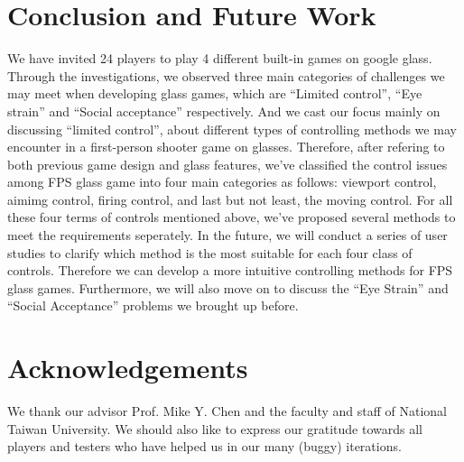 \documentclass{acm_proc_article-sp}
\begin{document}
\section{Conclusion and Future Work}
We have invited 24 players to play 4 different built-in games on google glass. Through the investigations, we observed three main categories of challenges we may meet when developing glass games, which are ``Limited control'', ``Eye strain'' and ``Social acceptance'' respectively. And we cast our focus mainly on discussing ``limited control'', about different types of controlling methods we may encounter in a first-person shooter game on glasses.
Therefore, after refering to both previous game design and glass features, we've classified the control issues among FPS glass game into four main categories as follows: viewport control, aimimg control, firing control, and last but not least, the moving control. For all these four terms of controls mentioned above, we've proposed several methods to meet the requirements seperately.
In the future, we will conduct a series of user studies to clarify which method is the most suitable for each four class of controls. Therefore we can develop a more intuitive controlling methods for FPS glass games. Furthermore, we will also move on to discuss the ``Eye Strain'' and ``Social Acceptance'' problems we brought up before.


\section{Acknowledgements}
We thank our advisor Prof. Mike Y. Chen and the faculty and staff of National Taiwan University. We should also like to express our gratitude towards all players and testers who have helped us in our many (buggy) iterations.





\balancecolumns
\end{document}
